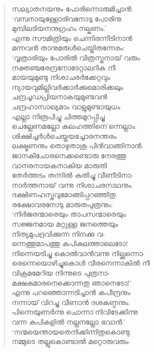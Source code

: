 \begin{verse}
സല്യാതനയനും പോരിന്നൊരുമിച്ചാന്‍.\\
‘വമ്പനായുള്ളോരിവനോടു പോരിനു\\
മുമ്പിലടിയനനുഗ്രഹം നല്കണം.’\\
എന്നു സൗമിത്രിയും ചെന്നിരന്നീടിനാന്‍\\
മന്നവന്‍ താനുമരുള്‍ചെയ്തിതന്നേരം:\\
‘വൃത്രാരിയും പോരില്‍ വിത്രസ്തനായ് വരും\\
നക്തഞ്ചരേന്ദ്രനോടേറ്റാലറിക നീ\\
മായയുമുണ്ടു നിശാചരര്‍ക്കേറ്റവും\\
ന്യായവുമില്ലിവര്‍ക്കാര്‍ക്കുമൊരിക്കലും\\
ചന്ദ്രചൂഡപ്രിയനാകയുമുണ്ടവന്‍\\
ചന്ദ്രഹാസാഖ്യമാം വാളുമുണ്ടായുധം\\
എല്ലാ നിരൂപിച്ചു ചിത്തമുറപ്പിച്ചു\\
ചെല്ലേണമല്ലോ കലഹത്തിനെ’ന്നെല്ലാം.\\
ശിക്ഷിച്ചര്‍ള്‍ചെയ്തയച്ചോരനന്തരം\\
ലക്ഷ്മണനും തൊഴുതാശു പിന്‍വാങ്ങിനാന്‍.\\
ജാനകീചോരനെക്കണ്ടൊരു നേരത്തു\\
വാനരനായകനാകിയ മാരുതി\\
തേര്‍ത്തടം തന്നില്‍ കുതിച്ചു വീണീടിനാ-\\
നാര്‍ത്തനായ് വന്നു നിശാചരനാഥനും.\\
ദക്ഷിണഹസ്തവുമോങ്ങിപ്പറഞ്ഞിതു\\
രക്ഷോവരനോടു മാരുതപുത്രനും:\\
‘നിര്‍ജരന്മാരെയും താപസന്മാരെയും\\
സജ്ജനമായ മറ്റുള്ള ജനത്തെയും\\
നിത്യമുപദ്രവിക്കുന്ന നിനക്കു വ-\\
ന്നെത്തുമാപത്തു കപികുലത്താലെടോ!\\
നിന്നെയടിച്ചു കൊല്‍വാന്‍വന്നു നില്ക്കുന്നൊ-\\
രെന്നെയൊഴിച്ചുകൊള്‍ വീരനെന്നാകില്‍ നീ\\
വിക്രമമേറിയ നിന്നുടെ പുത്രനാ-\\
മക്ഷകുമാരനെക്കൊന്നതു ഞാനെടോ!’\\
എന്നു പറഞ്ഞൊന്നടിച്ചാന്‍ കപീന്ദ്രനും\\
നന്നായ് വിറച്ചു വീണാന്‍ ദശകണ്ഠനും.\\
പിന്നെയുണര്‍ന്നു ചൊന്നാ’നിവിടേക്കിന്നു\\
വന്ന കപികളില്‍ നല്ലനല്ലോ ഭവാന്‍.’\\
‘നന്മയെന്തായതെനിക്കിന്നിതുകൊണ്ടു\\
നമ്മുടെ തല്ലുകൊണ്ടാല്‍ മറ്റൊരുവരും\\

\end{verse}
